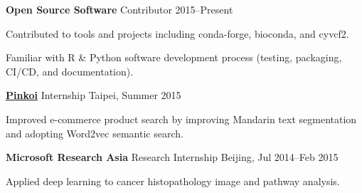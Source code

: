 \begin{entrylist}
\item \textbf{Open Source Software}
Contributor \hfill 2015--Present
\begin{detaillist}
    \item Contributed to tools and projects including conda-forge, bioconda, and cyvcf2.
    \item Familiar with R \& Python software development process (testing, packaging, CI/CD, and documentation).
\end{detaillist}

\item \href{http://pinkoi.com}{\textbf{Pinkoi}} Internship \hfill Taipei, Summer 2015
\begin{detaillist}
    \item Improved e-commerce product search by improving Mandarin text segmentation and adopting Word2vec semantic search.
\end{detaillist}

\item \textbf{Microsoft Research Asia} Research Internship \hfill Beijing, Jul 2014--Feb 2015
\begin{detaillist}
    \item Applied deep learning to cancer histopathology image and pathway analysis.
\end{detaillist}


\end{entrylist}
